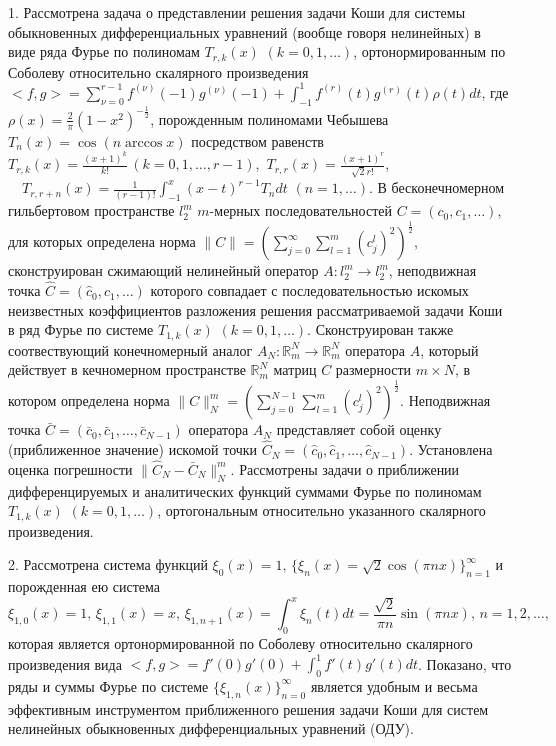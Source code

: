 \Conclusion

1. Рассмотрена задача о представлении решения задачи Коши для системы  обыкновенных  дифференциальных  уравнений (вообще говоря нелинейных) в виде  ряда  Фурье по полиномам $T_{r,k}(x)$ $(k=0,1,\ldots)$, ортонормированным по Соболеву относительно скалярного произведения
$<f,g>=\sum_{\nu=0}^{r-1}f^{(\nu)}(-1)g^{(\nu)}(-1)+\int_{-1}^1 f^{(r)}(t)g^{(r)}(t)\rho(t)dt$, где $\rho(x)=\frac2\pi(1-x^2)^{-\frac12}$, порожденным полиномами Чебышева $T_n(x)=\cos(n\arccos x)$ посредством равенств $T_{r,k}(x) =\frac{(x+1)^k}{k!}\, ( k=0,1,\ldots, r-1)$,\, $T_{r,r}(x) =\frac{(x+1)^r}{\sqrt{2}r!}$,\, $\quad T_{r,r+n}(x) =\frac{1}{(r-1)!}\int_{-1}^x(x-t)^{r-1}T_{n}dt\,\, ( n=1,\ldots)$.  В бесконечномерном гильбертовом  пространстве $l_2^m$ $m$-мерных последовательностей  $C=(c_0,c_1,\ldots)$, для которых определена норма
$\|C\|=\left(\sum\nolimits_{j=0}^\infty \sum\nolimits_{l=1}^{m}(c_j^l)^2\right)^\frac12$, сконструирован сжимающий нелинейный оператор  $A: l_2^m\to l_2^m$,  неподвижная точка $\hat C=(\hat c_0,\hat c_1,\ldots)$ которого совпадает с последовательностью  искомых неизвестных коэффициентов разложения решения рассматриваемой задачи Коши в ряд Фурье по системе $T_{1,k}(x)$ $(k=0,1,\ldots)$. Сконструирован также соотвествующий конечномерный аналог $A_N:\mathbb{R}^N_m\to \mathbb{R}^N_m$ оператора $A$, который действует в кечномерном пространстве  $\mathbb{R}^N_m$ матриц $C$ размерности $m\times N$, в котором определена норма
$\|C\|_N^m=\left(\sum\nolimits_{j=0}^{N-1} \sum\nolimits_{l=1}^{m}(c_j^l)^2\right)^\frac12$. Неподвижная точка $\bar C=(\bar c_0,\bar c_1,\ldots, \bar c_{N-1})$ оператора $A_N$ представляет собой оценку (приближенное значение) искомой точки $\hat C_N=(\hat c_0,\hat c_1,\ldots, \hat c_{N-1})$. Установлена оценка погрешности $\|\hat C_N-\bar C_N\|_N^m$. Рассмотрены задачи о приближении дифференцируемых и аналитических функций суммами Фурье по полиномам $T_{1,k}(x)$ $(k=0,1,\ldots)$, ортогональным относительно указанного скалярного произведения.


2. Рассмотрена система функций  $\xi_0(x)=1,\, \{\xi_n(x)=\sqrt{2}\cos(\pi nx)\}_{n=1}^\infty$ и порожденная ею система
$$
\xi_{1,0}(x)=1,\, \xi_{1,1}(x)=x,\, \xi_{1,n+1}(x)=\int_0^x \xi_{n}(t)dt=\frac{\sqrt{2}}{\pi n}\sin(\pi nx),\, n=1,2,\ldots,
$$
которая является ортонормированной по Соболеву относительно скалярного произведения  вида $<f,g>=f'(0)g'(0)+\int_{0}^{1}f'(t)g'(t)dt$. Показано, что ряды и суммы Фурье по системе $\{\xi_{1,n}(x)\}_{n=0}^\infty$  является удобным и весьма эффективным инструментом приближенного решения задачи Коши для систем нелинейных обыкновенных дифференциальных уравнений (ОДУ).

